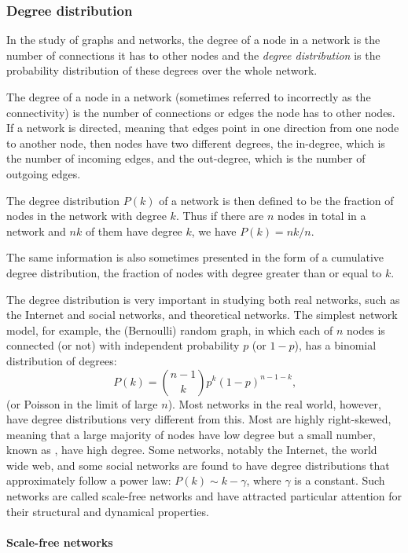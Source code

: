     \subsubsection{Degree distribution}
    
      In the study of graphs and networks, the degree of a node in a network is the number of connections it has to other nodes and the \emph{degree distribution} is the probability distribution of these degrees over the whole network.
      
      The degree of a node in a network (sometimes referred to incorrectly as the connectivity) is the number of connections or edges the node has to other nodes. If a network is directed, meaning that edges point in one direction from one node to another node, then nodes have two different degrees, the in-degree, which is the number of incoming edges, and the out-degree, which is the number of outgoing edges.

      The degree distribution $P(k)$ of a network is then defined to be the fraction of nodes in the network with degree $k$. Thus if there are $n$ nodes in total in a network and $nk$ of them have degree $k$, we have $P(k) = nk/n$.

      The same information is also sometimes presented in the form of a cumulative degree distribution, the fraction of nodes with degree greater than or equal to $k$.
      
      The degree distribution is very important in studying both real networks, such as the Internet and social networks, and theoretical networks. The simplest network model, for example, the (Bernoulli) random graph, in which each of $n$ nodes is connected (or not) with independent probability $p$ (or $1 − p$), has a binomial distribution of degrees:
      $$P(k) = \binom{n-1}{k} p^k (1 - p)^{n-1-k}\mbox{,}$$
      (or Poisson in the limit of large $n$). Most networks in the real world, however, have degree distributions very different from this. Most are highly right-skewed, meaning that a large majority of nodes have low degree but a small number, known as , have high degree. Some networks, notably the Internet, the world wide web, and some social networks are found to have degree distributions that approximately follow a power law: $P(k) \sim k−\gamma$, where $\gamma$ is a constant. Such networks are called scale-free networks and have attracted particular attention for their structural and dynamical properties.
      
      \paragraph{Scale-free networks}
  
